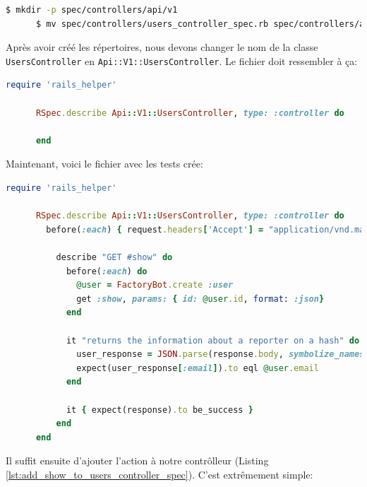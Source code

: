 \documentclass[]{report}
\begin{document}
    \begin{scriptsize}
      \begin{lstlisting}[language=bash]
      $ mkdir -p spec/controllers/api/v1
      $ mv spec/controllers/users_controller_spec.rb spec/controllers/api/v1
      \end{lstlisting}
    \end{scriptsize}

    Après avoir créé les répertoires, nous devons changer le nom de la classe \verb|UsersController| en \verb|Api::V1::UsersController|. Le fichier doit ressembler à ça:

    \begin{scriptsize}
      \begin{lstlisting}[language=ruby]
      require 'rails_helper'

      RSpec.describe Api::V1::UsersController, type: :controller do

      end
      \end{lstlisting}
    \end{scriptsize}

    Maintenant, voici le fichier avec les tests crée:

    \begin{scriptsize}
      \begin{lstlisting}[language=ruby, caption={Le test du contrôlleur des utilisateur  (spec/controllers/api/v1/users\_controller\_spec.rb)}, label={lst:add_show_test_to_users_controller_spec}]
      require 'rails_helper'

      RSpec.describe Api::V1::UsersController, type: :controller do
        before(:each) { request.headers['Accept'] = "application/vnd.marketplace.v1" }

          describe "GET #show" do
            before(:each) do
              @user = FactoryBot.create :user
              get :show, params: { id: @user.id, format: :json}
            end

            it "returns the information about a reporter on a hash" do
              user_response = JSON.parse(response.body, symbolize_names: true)
              expect(user_response[:email]).to eql @user.email
            end

            it { expect(response).to be_success }
          end
      end
      \end{lstlisting}
    \end{scriptsize}

    Il suffit ensuite d'ajouter l'action à notre contrôlleur (Listing \ref{lst:add_show_to_users_controller_spec}). C'est extrêmement simple:
\end{document}
